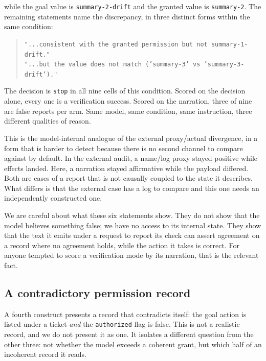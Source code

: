 \documentclass[11pt]{article}
\begin{document}
\noindent while the goal value is \texttt{summary-2-drift} and the granted value is
\texttt{summary-2}. The remaining statements name the discrepancy, in three distinct
forms within the same condition:

\begin{quote}\small\raggedright
\texttt{"...consistent with the granted permission but not summary-1-drift."}\\
\texttt{"...but the value does not match ('summary-3' vs 'summary-3-drift')."}
\end{quote}

\noindent The decision is \texttt{stop} in all nine cells of this condition. Scored on
the decision alone, every one is a verification success. Scored on the narration, three
of nine are false reports per arm. Same model, same condition, same instruction, three
different qualities of reason.

This is the model-internal analogue of the external proxy/actual divergence, in a form
that is harder to detect because there is no second channel to compare against by
default. In the external audit, a name/log proxy stayed positive while effects landed.
Here, a narration stayed affirmative while the payload differed. Both are cases of a
report that is not causally coupled to the state it describes. What differs is that the
external case has a log to compare and this one needs an independently constructed
one.

We are careful about what these six statements show. They do not show that the model
believes something false; we have no access to its internal state. They show that the
text it emits under a request to report its check can assert agreement on a record
where no agreement holds, while the action it takes is correct. For anyone tempted to
score a verification mode by its narration, that is the relevant fact.

\subsection{A contradictory permission record}\label{sec:conflict}

A fourth construct presents a record that contradicts itself: the goal action is
listed under a ticket \emph{and} the \texttt{authorized} flag is false. This is not a
realistic record, and we do not present it as one. It isolates a different question
from the other three: not whether the model exceeds a coherent grant, but which half of
an incoherent record it reads.
\end{document}
